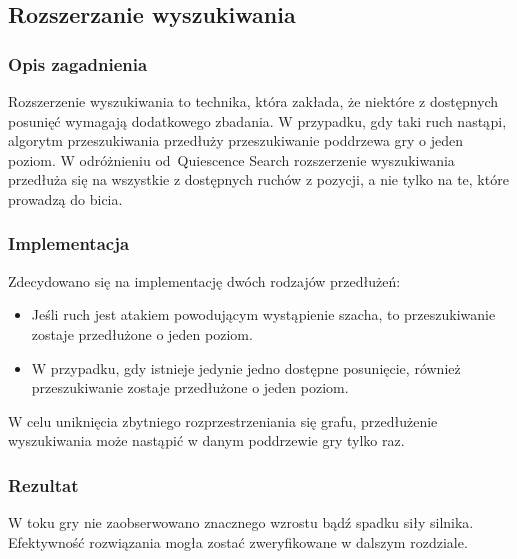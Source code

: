 \subsection{Rozszerzanie wyszukiwania}
\label{subsec:rozszerzanie-wyszukiwania}

\subsubsection{Opis zagadnienia}
Rozszerzenie wyszukiwania to technika, która zakłada, że niektóre z dostępnych posunięć wymagają dodatkowego zbadania.
W przypadku, gdy taki ruch nastąpi, algorytm przeszukiwania przedłuży przeszukiwanie poddrzewa gry o jeden poziom.
W odróżnieniu od~Quiescence Search rozszerzenie wyszukiwania przedłuża się na wszystkie z dostępnych ruchów z pozycji, a nie tylko na te, które prowadzą do bicia.

\subsubsection{Implementacja}
Zdecydowano się na implementację dwóch rodzajów przedłużeń:
\begin{itemize}
    \item Jeśli ruch jest atakiem powodującym wystąpienie szacha, to przeszukiwanie zostaje przedłużone o jeden poziom.
    \item W przypadku, gdy istnieje jedynie jedno dostępne posunięcie, również przeszukiwanie zostaje przedłużone o jeden poziom.
\end{itemize}
W celu uniknięcia zbytniego rozprzestrzeniania się grafu, przedłużenie wyszukiwania może nastąpić w danym poddrzewie gry tylko raz.
\subsubsection{Rezultat}
W toku gry nie zaobserwowano znacznego wzrostu bądź spadku siły silnika.
Efektywność rozwiązania mogła zostać zweryfikowane w dalszym rozdziale.